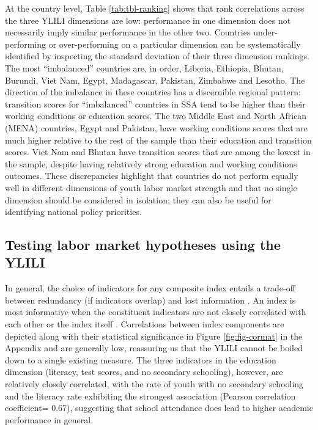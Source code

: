 \documentclass[
  a4paper, twoside, 12pt]{book}
\begin{document}
At the country level, Table \ref{tab:tbl-ranking} shows that rank correlations across the three YLILI dimensions are low: performance in one dimension does not necessarily imply similar performance in the other two. Countries under-performing or over-performing on a particular dimension can be systematically identified by inspecting the standard deviation of their three dimension rankings. The most ``imbalanced'' countries are, in order, Liberia, Ethiopia, Bhutan, Burundi, Viet Nam, Egypt, Madagascar, Pakistan, Zimbabwe and Lesotho. The direction of the imbalance in these countries has a discernible regional pattern: transition scores for ``imbalanced'' countries in SSA tend to be higher than their working conditions or education scores. The two Middle East and North African (MENA) countries, Egypt and Pakistan, have working conditions scores that are much higher relative to the rest of the sample than their education and transition scores. Viet Nam and Bhutan have transition scores that are among the lowest in the sample, despite having relatively strong education and working conditions outcomes. These discrepancies highlight that countries do not perform equally well in different dimensions of youth labor market strength and that no single dimension should be considered in isolation; they can also be useful for identifying national policy priorities.

\hypertarget{testing-labor-market-hypotheses-using-the-ylili}{%
\subsection{Testing labor market hypotheses using the YLILI}\label{testing-labor-market-hypotheses-using-the-ylili}}

In general, the choice of indicators for any composite index entails a trade-off between redundancy (if indicators overlap) and lost information \autocite{oecd2008}. An index is most informative when the constituent indicators are not closely correlated with each other or the index itself \autocite{noorbakhsh1998}. Correlations between index components are depicted along with their statistical significance in Figure \ref{fig:fig-cormat} in the Appendix and are generally low, reassuring us that the YLILI cannot be boiled down to a single existing measure. The three indicators in the education dimension (literacy, test scores, and no secondary schooling), however, are relatively closely correlated, with the rate of youth with no secondary schooling and the literacy rate exhibiting the strongest association (Pearson correlation coefficient= 0.67), suggesting that school attendance does lead to higher academic performance in general.
\end{document}
